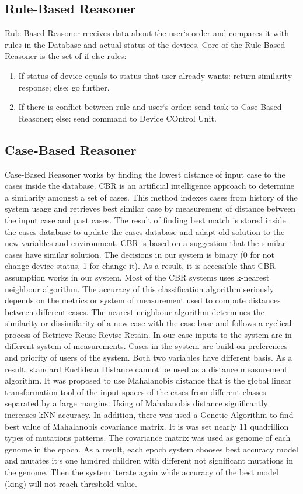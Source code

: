 \documentclass{llncs}
\begin{document}
    \subsection{Rule-Based Reasoner}
    Rule-Based Reasoner receives data about the user`s order and compares it with rules in the Database and actual status of the devices.
    Core of the Rule-Based Reasoner is the set of if-else rules:
    \begin{enumerate}
        \item If status of device equals to status that user already wants: return similarity response; else: go further.
        \item If there is conflict between rule and user`s order: send task to Case-Based Reasoner; else: send command to Device COntrol Unit.
    \end{enumerate}
    \subsection{Case-Based Reasoner}
    Case-Based Reasoner works by finding the lowest distance of input case to the cases inside the database.
    CBR is an artificial intelligence approach to determine a similarity amongst a set of cases.
    This method indexes cases from history of the system usage and retrieves best similar case by measurement of distance between the input case and past cases.
    The result of finding best match is stored inside the cases database to update the cases database and adapt old solution to the new variables and environment.
    CBR is based on a suggestion that the similar cases have similar solution.
    The decisions in our system is binary (0 for not change device status, 1 for change it).
    As a result, it is accessible that CBR assumption works in our system.
    Most of the CBR systems uses k-nearest neighbour algorithm.
    The accuracy of this classification algorithm seriously depends on the metrics or system of measurement used to compute distances between different cases.
    The nearest neighbour algorithm determines the similarity or dissimilarity of a new case with the case base and follows a cyclical process of Retrieve-Reuse-Revise-Retain.
    In our case inputs to the system are in different system of measurements.
    Cases in the system are build on preferences and priority of users of the system.
    Both two variables have different basis.
    As a result, standard Euclidean Distance cannot be used as a distance measurement algorithm.
    It was proposed to use Mahalanobis distance that is the global linear transformation tool of the input spaces of the cases from different classes separated by a large margins.
    Using of Mahalanobis distance significantly increases kNN accuracy.
    In addition, there was used a Genetic Algorithm to find best value of Mahalanobis covariance matrix.
    It is was set nearly 11 quadrillion types of mutations patterns.
    The covariance matrix was used as genome of each genome in the epoch.
    As a result, each epoch system chooses best accuracy model and mutates it`s one hundred children with different not significant mutations in the genome.
    Then the system iterate again while accuracy of the best model (king) will not reach threshold value.
\end{document}
